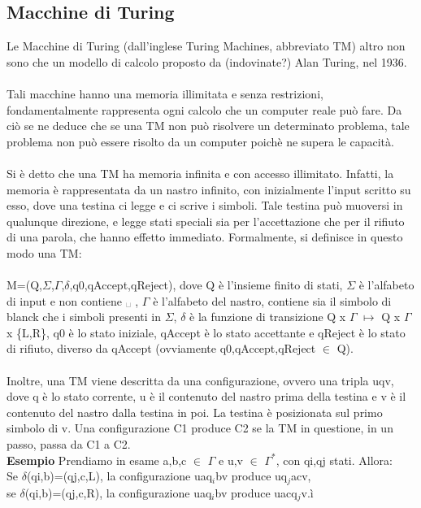 \documentclass[]{article}
\begin{document}
		\subsection{Macchine di Turing}
			Le Macchine di Turing (dall'inglese Turing Machines, abbreviato TM) altro non sono che un modello di calcolo proposto da (indovinate?) Alan Turing, nel 1936.\\\\ Tali macchine hanno una memoria illimitata e senza restrizioni, fondamentalmente rappresenta ogni calcolo che un computer reale può fare. Da ciò se ne deduce che se una TM non può risolvere un determinato problema, tale problema non può essere risolto da un computer poichè ne supera le capacità.\\\\
			Si è detto che una TM ha memoria infinita e con accesso illimitato. Infatti, la memoria è rappresentata da un nastro infinito, con inizialmente l'input scritto su esso, dove una testina ci legge e ci scrive i simboli. Tale testina può muoversi in qualunque direzione, e legge stati speciali sia per l'accettazione che per il rifiuto di una parola, che hanno effetto immediato. Formalmente, si definisce in questo modo una TM:\\\\
			M=(Q,$\Sigma$,$\Gamma$,$\delta$,q0,qAccept,qReject), dove Q è l'insieme finito di stati, $\Sigma$ è l'alfabeto di input e non contiene ␣ , $\Gamma$ è l'alfabeto del nastro, contiene sia il simbolo di blanck che i simboli presenti in $\Sigma$, $\delta$ è la funzione di transizione Q x $\Gamma$ $\mapsto$ Q x $\Gamma$ x \{L,R\}, q0 è lo stato iniziale, qAccept è lo stato accettante e qReject è lo stato di rifiuto, diverso da qAccept (ovviamente q0,qAccept,qReject $\in$ Q).\\\\
			Inoltre, una TM viene descritta da una configurazione, ovvero una tripla uqv, dove q è lo stato corrente, u è il contenuto del nastro prima della testina e v è il contenuto del nastro dalla testina in poi. La testina è posizionata sul primo simbolo di v. Una configurazione C1 produce C2 se la TM in questione, in un passo, passa da C1 a C2.\\
			\textbf{Esempio} Prendiamo in esame a,b,c $\in$ $\Gamma$ e u,v $\in$ $\Gamma^*$, con qi,qj stati. Allora:\\
			Se $\delta$(qi,b)=(qj,c,L), la configurazione uaq$_i$bv produce uq$_j$acv,\\
			se $\delta$(qi,b)=(qj,c,R), la configurazione uaq$_i$bv produce uacq$_j$v.ì\\\\
\end{document}
